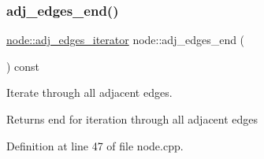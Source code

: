 \subsubsection{\texorpdfstring{adj\+\_\+edges\+\_\+end()}{adj\_edges\_end()}}
{\footnotesize\ttfamily \mbox{\hyperlink{classnode_abdd49248203010f2d5432dfef22d017a}{node\+::adj\+\_\+edges\+\_\+iterator}} node\+::adj\+\_\+edges\+\_\+end (\begin{DoxyParamCaption}{ }\end{DoxyParamCaption}) const}

Iterate through all adjacent edges.

\begin{DoxyReturn}{Returns}
end for iteration through all adjacent edges 
\end{DoxyReturn}


Definition at line 47 of file node.\+cpp.


